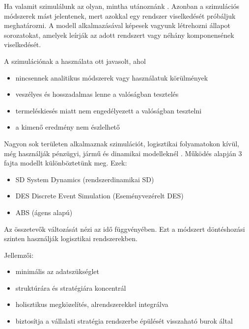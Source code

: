 




Ha valamit szimulálunk az olyan, mintha utánoznánk \cite{szim}. Azonban a szimulációs módszerek mást jelentenek, mert azokkal egy rendszer viselkedését próbáljuk meghatározni. A modell alkalmazásával képesek vagyunk létrehozni állapot sorozatokat, amelyek leírják az adott rendszert vagy néhány komponensének viselkedését. 

A szimulációnak a használata ott javasolt, ahol

\begin{itemize}
	\item nincsennek analitikus módszerek vagy használatuk körülmények
	\item veszélyes és hosszadalmas lenne a valóságban tesztelés
	\item termeléskiesés miatt nem engedélyezett a valóságban tesztelni
	\item a kimenő eredmény nem észlelhető
\end{itemize}

Nagyon sok területen alkalmaznak szimulációt, logisztikai folyamatokon kívül, még használják pénzügyi, jármű és dinamikai modelleknél \cite{szim2}. 
Működés alapján 3 fajta modellt különböztetünk meg.
Ezek:

\begin{itemize}
	\item SD System Dynamics (rendszerdinamikai SD)
	\item  DES Discrete Event Simulation (Eseményvezérelt DES)
	\item  ABS (ágens alapú)
\end{itemize}


Az összetevők változását nézi az idő függvényében. Ezt a módszert döntéshozási szinten használják logisztikai rendszerekben. 

Jellemzői:

\begin{itemize}
	\item minimális az adatszükséglet
	\item  struktúrára és stratégiára koncentrál
	\item  holisztikus megközelítés, alrendszerekkel integrálva
	\item biztosítja a vállalati stratégia rendszerbe épülését visszaható burok által
\end{itemize}

